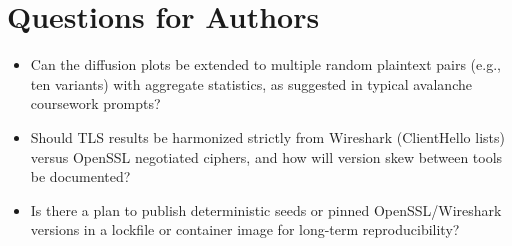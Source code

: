 \section{Questions for Authors}
\label{sec:questions-authors}

\begin{itemize}
  \item Can the diffusion plots be extended to multiple random plaintext pairs (e.g., ten variants) with aggregate statistics, as suggested in typical avalanche coursework prompts?
  \item Should TLS results be harmonized strictly from Wireshark (ClientHello lists) versus OpenSSL negotiated ciphers, and how will version skew between tools be documented?
  \item Is there a plan to publish deterministic seeds or pinned OpenSSL/Wireshark versions in a lockfile or container image for long-term reproducibility?
\end{itemize}

